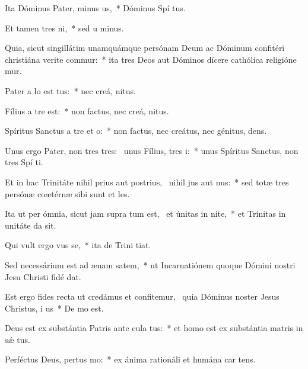 \item Ita Dóminus Pater, minus us,~* Dóminus Spí tus.
\item Et tamen  tres ni,~* sed u  minus.
\item Quia, sicut singillátim unamquámque persónam Deum ac Dóminum confitéri christiána verite commur:~* ita tres Deos aut Dóminos dícere cathólica religióne mur.
\item Pater a lo est tus:~* nec creá,  nitus.
\item Fílius a tre  est:~* non factus, nec creá,  nitus.
\item Spíritus Sanctus a tre et o:~* non factus, nec creátus, nec génitus,  dens.
\item Unus ergo Pater, non tres tres:~\pscross{} unus Fílius,  tres i:~* unus Spíritus Sanctus, non tres Spí ti.
\item Et in hac Trinitáte nihil prius aut postrius,~\pscross{} nihil jus aut nus:~* sed totæ tres persónæ coætérnæ sibi sunt et les.
\item Ita ut per ómnia, sicut jam supra tum est,~\pscross{} et únitas in nite,~* et Trínitas in unitáte da sit.
\item Qui vult ergo vus se,~* ita de Trini tiat.
\item Sed necessárium est ad ænam satem,~* ut Incarnatiónem quoque Dómini nostri Jesu Christi fidé dat.
\item Est ergo fides recta ut credámus et confitemur,~\pscross{} quia Dóminus noster Jesus Christus, i us~* De  mo est.
\item Deus est ex substántia Patris ante cula tus:~* et homo est ex substántia matris in sǽ tus.
\item Perféctus Deus, pertus mo:~* ex ánima rationáli et humána car tens.
